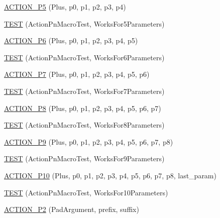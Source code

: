 \begin{DoxyCompactItemize}
\mbox{\hyperlink{namespacetesting_1_1gmock__generated__actions__test_a948863fb38d913f02a0c5bde6be0b0a0}{A\+C\+T\+I\+O\+N\+\_\+\+P5}} (Plus, p0, p1, p2, p3, p4)
\item 
\mbox{\hyperlink{namespacetesting_1_1gmock__generated__actions__test_a132cab07373e037a06807a5948b1410b}{T\+E\+ST}} (Action\+Pn\+Macro\+Test, Works\+For5\+Parameters)
\item 
\mbox{\hyperlink{namespacetesting_1_1gmock__generated__actions__test_a97cbcc90a3063a1882886ded61fc8979}{A\+C\+T\+I\+O\+N\+\_\+\+P6}} (Plus, p0, p1, p2, p3, p4, p5)
\item 
\mbox{\hyperlink{namespacetesting_1_1gmock__generated__actions__test_a9031cb5f0e3d9de21ed3ff0a98a311d4}{T\+E\+ST}} (Action\+Pn\+Macro\+Test, Works\+For6\+Parameters)
\item 
\mbox{\hyperlink{namespacetesting_1_1gmock__generated__actions__test_a58bc376a0637fc1e89e6503466d1b9cd}{A\+C\+T\+I\+O\+N\+\_\+\+P7}} (Plus, p0, p1, p2, p3, p4, p5, p6)
\item 
\mbox{\hyperlink{namespacetesting_1_1gmock__generated__actions__test_add3cba52186c7ce384808c222492ee18}{T\+E\+ST}} (Action\+Pn\+Macro\+Test, Works\+For7\+Parameters)
\item 
\mbox{\hyperlink{namespacetesting_1_1gmock__generated__actions__test_ad8766a6dbaeffbf36658d3b5f75d3b00}{A\+C\+T\+I\+O\+N\+\_\+\+P8}} (Plus, p0, p1, p2, p3, p4, p5, p6, p7)
\item 
\mbox{\hyperlink{namespacetesting_1_1gmock__generated__actions__test_a1913bedf1d5cf736e91f2be119de0d5f}{T\+E\+ST}} (Action\+Pn\+Macro\+Test, Works\+For8\+Parameters)
\item 
\mbox{\hyperlink{namespacetesting_1_1gmock__generated__actions__test_ab023ad5e95ca2c2b8845963ce7222e00}{A\+C\+T\+I\+O\+N\+\_\+\+P9}} (Plus, p0, p1, p2, p3, p4, p5, p6, p7, p8)
\item 
\mbox{\hyperlink{namespacetesting_1_1gmock__generated__actions__test_a52d6dc447a4a71524adfeb7c8f7b6a68}{T\+E\+ST}} (Action\+Pn\+Macro\+Test, Works\+For9\+Parameters)
\item 
\mbox{\hyperlink{namespacetesting_1_1gmock__generated__actions__test_a3c6e7ef6aefc94efc9e815e92f0b3e47}{A\+C\+T\+I\+O\+N\+\_\+\+P10}} (Plus, p0, p1, p2, p3, p4, p5, p6, p7, p8, last\+\_\+param)
\item 
\mbox{\hyperlink{namespacetesting_1_1gmock__generated__actions__test_a564fd77344f58b26577452a380c93935}{T\+E\+ST}} (Action\+Pn\+Macro\+Test, Works\+For10\+Parameters)
\item 
\mbox{\hyperlink{namespacetesting_1_1gmock__generated__actions__test_ad58030fe83ad47cdb4ff027f8399adb4}{A\+C\+T\+I\+O\+N\+\_\+\+P2}} (Pad\+Argument, prefix, suffix)

\end{DoxyCompactItemize}
